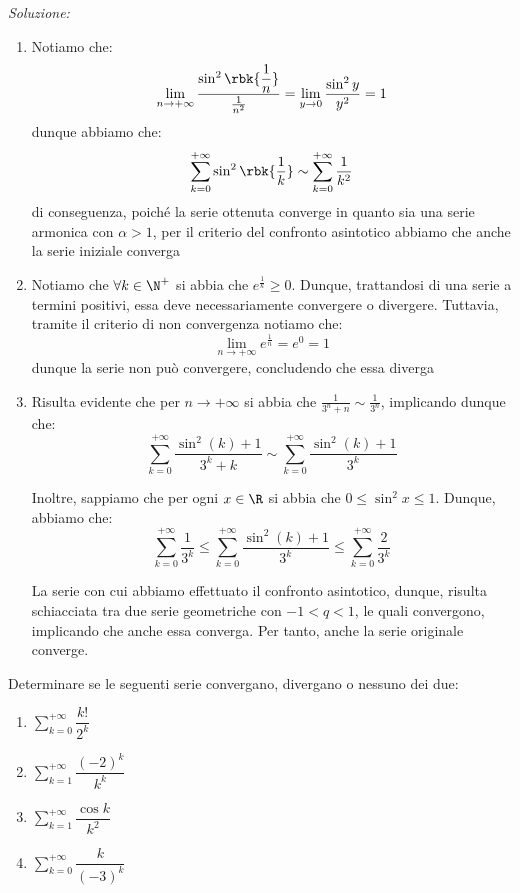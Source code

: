 \documentclass[a4paper, 12pt]{report}
\begin{document}
    \textit{Soluzione:}

    \begin{enumerate}
        \item Notiamo che:
        \[\lim_{n \to +\infty} \frac{\sin^2 \rbk{\dfrac{1}{n}}}{\frac{1}{n^2}} = \lim_{y \to 0} \frac{\sin^2 y}{y^2} = 1\]
        dunque abbiamo che:
        \[\sum\limits_{k = 0}^{+\infty} \sin^2 \rbk{\dfrac{1}{k}} \sim \sum\limits_{k = 0}^{+\infty} \frac{1}{k^2}\]
        di conseguenza, poiché la serie ottenuta converge in quanto sia una serie armonica con $\alpha > 1$, per il criterio del confronto asintotico abbiamo che anche la serie iniziale converga

        \item Notiamo che $\forall k \in \N^+$ si abbia che $e^{\frac{1}{k}} \geq 0$. Dunque, trattandosi di una serie a termini positivi, essa deve necessariamente convergere o divergere. Tuttavia, tramite il criterio di non convergenza notiamo che:
        \[\lim_{n \to +\infty} e^{\frac{1}{n}} = e^0 = 1\]
        dunque la serie non può convergere, concludendo che essa diverga

        \item Risulta evidente che per $n \to +\infty$ si abbia che $\frac{1}{3^n + n} \sim \frac{1}{3^n}$, implicando dunque che:
        \[ \sum_{k = 0}^{+\infty}  \frac{\sin^2 (k) + 1}{3^k + k} \sim  \sum_{k = 0}^{+\infty}  \frac{\sin^2 (k) + 1}{3^k}\]

        Inoltre, sappiamo che per ogni $x \in \R$ si abbia che $0 \leq \sin^2 x \leq 1$. Dunque, abbiamo che:
        \[\sum_{k = 0}^{+\infty} \frac{1}{3^k} \leq \sum_{k = 0}^{+\infty}  \frac{\sin^2 (k) + 1}{3^k} \leq \sum_{k = 0}^{+\infty} \frac{2}{3^k}\]

        La serie con cui abbiamo effettuato il confronto asintotico, dunque, risulta schiacciata tra due serie geometriche con $-1 < q < 1$, le quali convergono, implicando che anche essa converga. Per tanto, anche la serie originale converge.

    \end{enumerate}

    \begin{framedprob}{}
        Determinare se le seguenti serie convergano, divergano o nessuno dei due:
        \begin{enumerate}
            \item $\sum\limits_{k = 0}^{+\infty} \dfrac{k!}{2^k}$
            \item $\sum\limits_{k = 1}^{+\infty} \dfrac{(-2)^k}{k^k}$
            \item $\sum\limits_{k = 1}^{+\infty} \dfrac{\cos k}{k^2}$
            \item $\sum\limits_{k = 0}^{+\infty} \dfrac{k}{(-3)^k}$
        \end{enumerate}
    \end{framedprob}
\end{document}
